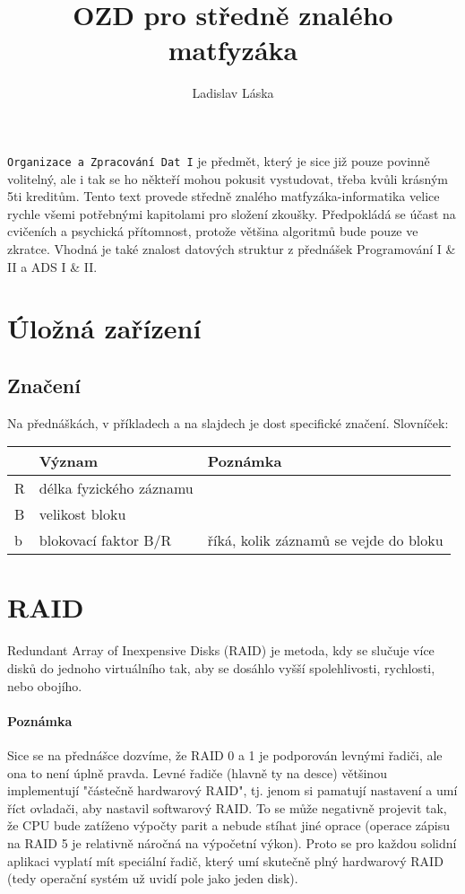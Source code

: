 \documentclass[a4paper,12pt]{article}
\title{OZD pro středně znalého matfyzáka}
\author{Ladislav Láska}
\begin{document}
\maketitle
\texttt{Organizace a Zpracování Dat I} je předmět, který je sice již pouze 
povinně volitelný, ale i tak se ho někteří mohou pokusit vystudovat, třeba kvůli 
krásným 5ti kreditům. Tento text provede středně znalého matfyzáka-informatika 
velice rychle všemi potřebnými kapitolami pro složení zkoušky. Předpokládá se 
účast na cvičeních a psychická přítomnost, protože většina algoritmů bude pouze 
ve zkratce. Vhodná je také znalost datových struktur z přednášek Programování I 
\& II a ADS I \& II.
\newpage
\tableofcontents
\newpage

\section{Úložná zařízení}
\setcounter{equation}{0}
\subsection{Značení}
\setcounter{equation}{0}
Na přednáškách, v příkladech a na slajdech je dost specifické značení.  
Slovníček: \\
\begin{tabular}{|l|l|l|}
\hline
 & Význam & Poznámka \\
\hline
\hline
R & délka fyzického záznamu & \\
\hline
B & velikost bloku & \\
\hline
b & blokovací faktor B/R & říká, kolik záznamů se vejde do bloku \\
\hline
\end{tabular}

\section{RAID}
\setcounter{equation}{0}
Redundant Array of Inexpensive Disks (RAID) je metoda, kdy se slučuje více disků 
do jednoho virtuálního tak, aby se dosáhlo vyšší spolehlivosti, rychlosti, nebo 
obojího.

\paragraph{Poznámka} Sice se na přednášce dozvíme, že RAID 0 a 1 je podporován 
levnými řadiči, ale ona to není úplně pravda. Levné řadiče (hlavně ty na desce) 
většinou implementují "částečně hardwarový RAID", tj. jenom si pamatují 
nastavení a umí říct ovladači, aby nastavil softwarový RAID. To se může 
negativně projevit tak, že CPU bude zatíženo výpočty parit a nebude stíhat jiné 
oprace (operace zápisu na RAID 5 je relativně náročná na výpočetní výkon). Proto 
se pro každou solidní aplikaci vyplatí mít speciální řadič, který umí skutečně 
plný hardwarový RAID (tedy operační systém už uvidí pole jako jeden disk).
\end{document}
